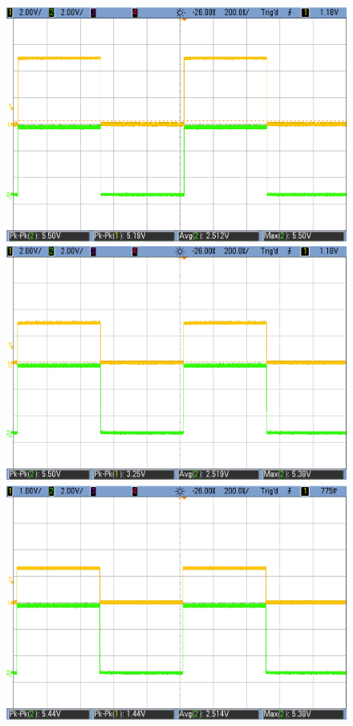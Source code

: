     \begin{figure}[h!]
        \centering
        \includegraphics[scale=0.19]{../Exercise2/LS-HCT-5V.png}\hspace{1cm}
        \includegraphics[scale=0.19]{../Exercise2/LS-HCT-3V.png}\\
		\vspace{0.2cm}
        \includegraphics[scale=0.19]{../Exercise2/LS-HCT-1p5V.png}\hspace{1cm}

\end{figure}
